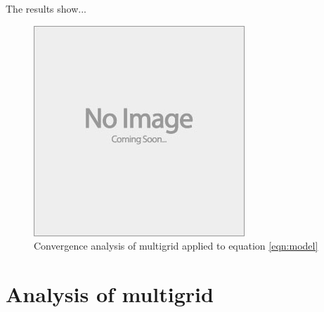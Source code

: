 The results show...


\begin{figure}[h]
	\centering
	\includegraphics[draft]{images/placeholder}
	\caption{Convergence analysis of multigrid applied to equation \eqref{eqn:model}}
\end{figure}







\section{Analysis of multigrid}



